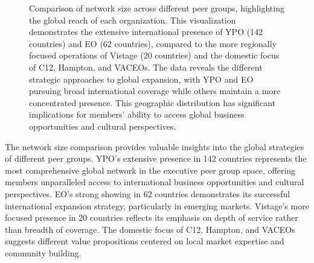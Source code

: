 \documentclass[conference]{IEEEtran}
\begin{document}
\begin{figure}[t]
\centering
{}
\caption{Comparison of network size across different peer groups, highlighting the global reach of each organization. This visualization demonstrates the extensive international presence of YPO (142 countries) and EO (62 countries), compared to the more regionally focused operations of Vistage (20 countries) and the domestic focus of C12, Hampton, and VACEOs. The data reveals the different strategic approaches to global expansion, with YPO and EO pursuing broad international coverage while others maintain a more concentrated presence. This geographic distribution has significant implications for members' ability to access global business opportunities and cultural perspectives.}
\label{fig:network_size}
\end{figure}

The network size comparison provides valuable insights into the global strategies of different peer groups. YPO's extensive presence in 142 countries represents the most comprehensive global network in the executive peer group space, offering members unparalleled access to international business opportunities and cultural perspectives. EO's strong showing in 62 countries demonstrates its successful international expansion strategy, particularly in emerging markets. Vistage's more focused presence in 20 countries reflects its emphasis on depth of service rather than breadth of coverage. The domestic focus of C12, Hampton, and VACEOs suggests different value propositions centered on local market expertise and community building.
\end{document}
